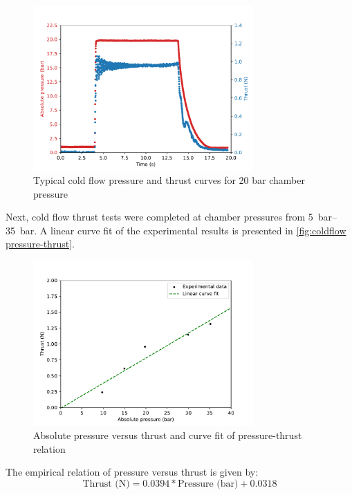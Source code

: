             \begin{figure}[!ht]
                \centering
                \includegraphics[width=0.75\textwidth]{assets/4 experiments/Example thrust 20 bar.pdf}
                \caption{Typical cold flow pressure and thrust curves for 20 bar chamber pressure}
                \label{fig:20bar cold flow}
            \end{figure}

            Next, cold flow thrust tests were completed at chamber pressures from \qtyrange{5}{35}{bar}. A linear curve fit of the experimental results is presented in \autoref{fig:coldflow pressure-thrust}.

            \begin{figure}[!ht]
                \centering
                \includegraphics[width=0.75\textwidth]{assets/4 experiments/pressure-thrust graph.pdf}
                \caption{Absolute pressure versus thrust and curve fit of pressure-thrust relation}
                \label{fig:coldflow pressure-thrust}
            \end{figure}

            The empirical relation of pressure versus thrust is given by:
            \[
            \text{Thrust (N)} = 0.0394*\text{Pressure (bar)} + 0.0318
            \]

